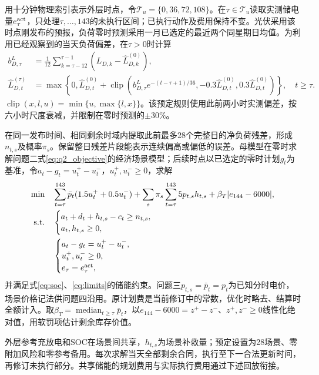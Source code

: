 用十分钟物理索引表示外层时点，令$\mathcal T_u=\{0,36,72,108\}$。在$\tau\in\mathcal T_u$读取实测储电量$e_\tau^{\rm act}$，只处理$\tau,\ldots,143$的未执行区间；已执行动作及费用保持不变。光伏采用该时点刚发布的预报，负荷零时预测采用一月已选定的最近两个同星期日均值。为利用已经观察到的当天负荷偏差，在$\tau>0$时计算
\begin{align}
 b^L_{D,\tau}&=\frac{1}{12}\sum_{k=\tau-12}^{\tau-1}
       (L_{D,k}-\widehat L^{(0)}_{D,k}),\label{eq:q3_load_bias}\\
 \widehat L^{(\tau)}_{D,t}&=\max\left\{0,\widehat L^{(0)}_{D,t}+
 \operatorname{clip}\!\left(b^L_{D,\tau}e^{-(t-\tau+1)/36},
       -0.3\widehat L^{(0)}_{D,t},0.3\widehat L^{(0)}_{D,t}\right)\right\},\quad t\ge\tau.
 \label{eq:q3_load_update}
\end{align}
$\operatorname{clip}(x,l,u)=\min\{u,\max\{l,x\}\}$。该预定规则使用此前两小时实测偏差，按六小时尺度衰减，并限制在零时预测的$\pm30\%$。

在同一发布时间、相同剩余时域内提取此前最多28个完整日的净负荷残差，形成$n_{t,s}$及概率$\pi_s$。保留整日残差片段能表示连续偏高或偏低的误差。母模型在零时求解问题二式\eqref{eq:q2_objective}的经济场景模型；后续时点以已选定的零时计划$g_t$为基准，令$a_t-g_t=u_t^+-u_t^-$，$u_t^+,u_t^-\ge0$，求解
\begin{align}
 \min\quad &\sum_{t=\tau}^{143}\bar p_t(1.5u_t^++0.5u_t^-)
 +\sum_s\pi_s\sum_{t=\tau}^{143}5p_{t,s}h_{t,s}
 +\beta_T|e_{144}-6000|,\label{eq:q3_revision_objective}\\
 \text{s.t.}\quad&\begin{cases}
 a_t+d_t+h_{t,s}-c_t\ge n_{t,s},\\
 a_t,h_{t,s}\ge0,
 \end{cases}
                    \label{eq:q3_revision_balance}\\
 &\begin{cases}
 a_t-g_t=u_t^+-u_t^-,\\
 u_t^+,u_t^-\ge0,\\
 e_\tau=e_\tau^{\rm act},
 \end{cases}\label{eq:q3_revision_contract}
\end{align}
并满足式\eqref{eq:soc}、\eqref{eq:limits}的储能约束。问题三$p_{t,s}=\bar p_t=p_t$为已知分时电价，场景价格记法供问题四沿用。原计划费是当前修订中的常数，优化时略去、结算时全额计入。取$\beta_T=\operatorname{median}_{t\ge\tau}\bar p_t$，以$e_{144}-6000=z^+-z^-$、$z^+,z^-\ge0$线性化绝对值，用软罚项估计剩余库存价值。

外层参考充放电和SOC在场景间共享，$h_{t,s}$为场景补救量；预定设置为28场景、零附加风险和零参考备用。每次求解当天全部剩余合同，执行至下一合法更新时间，再修订未执行部分。共享储能的规划费用与实际执行费用通过下述回放衔接。


